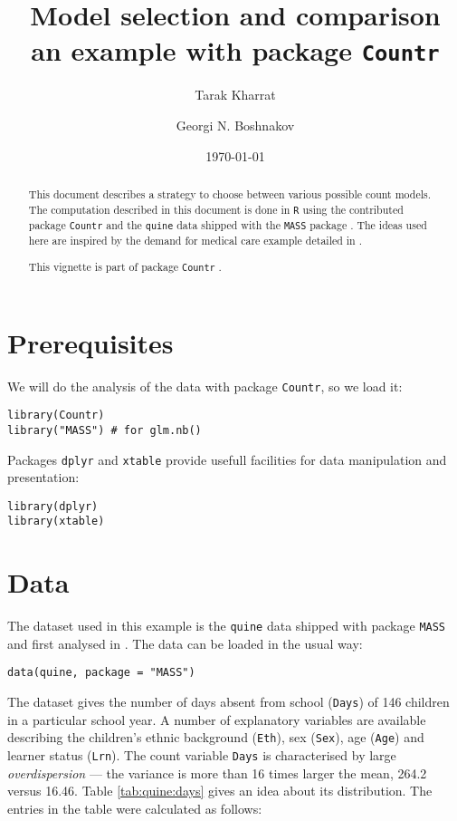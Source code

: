 \documentclass[a4paper,twoside,11pt]{article}
\author[1]{Tarak Kharrat}
\author[2]{Georgi N. Boshnakov}
\affil[1]{Salford Business School, University of Salford, UK.}
\affil[2]{School of Mathematics, University of Manchester, UK.}
\date{\today}
\title{Model selection and comparison\\\medskip
\large an example with package \texttt{Countr}}
\begin{document}
\maketitle
\begin{abstract}
This document describes a strategy to choose between various possible
count models. The computation described in this document is done in \texttt{R}
\citep{Rcore} using the contributed package \texttt{Countr} \citep{RpackageCountr} and
the \texttt{quine} data shipped with the \texttt{MASS} package \citep{Venables20102MASS}. The
ideas used here are inspired by the demand for medical care example detailed in
\citet[Section 6.3]{cameron2013regression}. 

This vignette is part of package \texttt{Countr} \citep[see][]{CountrJssArticle}.
\end{abstract}


\section{Prerequisites}
\label{sec:orga5a3f6d}

We will do the analysis of the data with package \texttt{Countr}, so we load it:
\begin{verbatim}
library(Countr)
library("MASS") # for glm.nb()
\end{verbatim}

Packages \texttt{dplyr} \citep{dplyr2016} and \texttt{xtable} \citep{xtable2016} provide
usefull facilities for data manipulation and presentation:
\begin{verbatim}
library(dplyr) 
library(xtable)
\end{verbatim}

\section{Data}
\label{sec:org9e0589a}

The dataset used in this example is the \texttt{quine} data shipped with 
package \texttt{MASS} \citep{Venables20102MASS} and first analysed in
\citet{aitkin1978analysis}. The data can be loaded in the usual way:
\begin{verbatim}
data(quine, package = "MASS")
\end{verbatim}

The dataset gives the number of days absent from school (\texttt{Days}) of
146
children in a particular school year. A number of
explanatory variables are available describing the children's ethnic background
(\texttt{Eth}), sex (\texttt{Sex}), age (\texttt{Age}) and learner status
(\texttt{Lrn}).  The count variable \texttt{Days} is characterised by large
\emph{overdispersion} --- the variance is more than
16 times larger the mean, 
264.2
versus 
16.46.
Table \ref{tab:quine:days} gives an idea about its
distribution. The entries in the table were calculated as follows:
\end{document}
